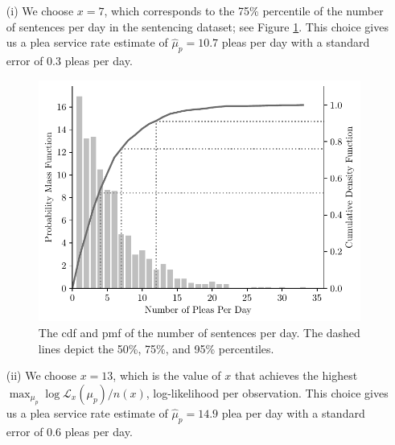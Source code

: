 \documentclass[11pt, oneside]{article}   	%
\theoremstyle{ModifiedStyle}
\begin{document}
			\begin{itemize}
				\vspace{-1mm}
				\item[(i)] We choose $x = 7$, which corresponds to the 75\% percentile of the number of sentences per day in the sentencing dataset; see Figure \ref{Figure_Sentences_Per_Day_Histogram}. This choice gives us a plea service rate estimate of $\hat{\mu}_p = 10.7$ pleas per day with a standard error of $0.3$ pleas per day.
				\vspace{-1mm}
				\begin{figure}[H]
					\centering
					\includegraphics[scale=0.75]{Figures/Histogram_Pleas_Per_Day}
					\vspace{-2mm}
					\caption{The cdf and pmf of the number of sentences per day. The dashed lines depict the 50\%, 75\%, and 95\% percentiles.}
					\label{Figure_Sentences_Per_Day_Histogram}
				\end{figure}
				\item[(ii)] We choose $x = 13$, which is the value of $x$ that achieves the highest $\max_{\mu_p} \log \mathcal{L}_x(\mu_p)/n(x)$, log-likelihood per observation. This choice gives us a plea service rate estimate of $\hat{\mu}_p = 14.9$ plea per day with a standard error of $0.6$ pleas per day.
			\end{itemize}
\end{document}
